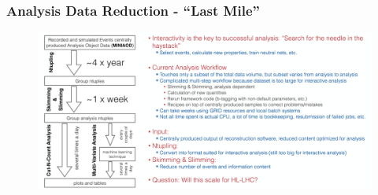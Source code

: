\begin{frame}
\frametitle{Analysis Data Reduction - ``Last Mile''}

\begin{figure}[htbp]
\begin{center}
\includegraphics[width=1.0\textwidth]{images/analysis-data-reduction.png}
\end{center}
\end{figure}

\end{frame}



